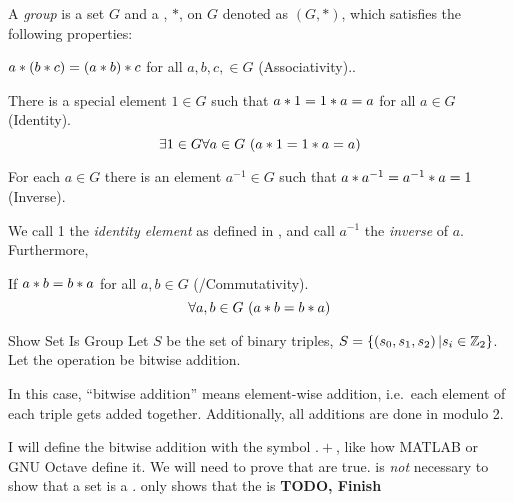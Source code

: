 \begin{definition}[Group]\label{def:Group}
  A \emph{group} is a set $G$ and a , $*$, on $G$ denoted as $(G, *)$, which satisfies the following properties:
  \begin{propertylist}
  \item $a * (b * c) = (a * b) * c$ for all $a, b, c, \in G$ (Associativity).\label{prop:Group_Properties-Associativity}.
  \item There is a special element $1 \in G$ such that $a * 1 = 1 * a = a$ for all $a \in G$ (Identity).\label{prop:Group_Properties-Identity}
    \begin{equation*}
      \exists 1 \in G \forall a \in G \, \left( a * 1 = 1 * a = a \right)
    \end{equation*}

  \item For each $a \in G$ there is an element $a^{-1} \in G$ such that $a * a^{-1} = a^{-1} * a = 1$  (Inverse).\label{prop:Group_Properties-Inverse}
  \end{propertylist}
  
  We call 1 the \emph{identity element} as defined in , and call $a^{-1}$ the \emph{inverse} of $a$.
  Furthermore,
  \begin{propertylist}[resume]
  \item If $a * b = b * a$ for all $a,b \in G$ (/Commutativity).\label{prop:Group_Properties-Commutativity}
    \begin{equation*}
      \forall a,b \in G \, \left( a * b = b * a \right)
    \end{equation*}
  \end{propertylist}
\end{definition}

\begin{example}{Show Set Is Group}
  Let $S$ be the set of binary triples, $S = \lbrace \left( s_{0}, s_{1}, s_{2} \right) \vert s_{i} \in \operatorname{\mathbb{Z}}_{2} \rbrace$.
  Let the operation be bitwise addition.
  \tcblower{}
  \begin{remark*}
    In this case, ``bitwise addition'' means element-wise addition, i.e.\ each element of each triple gets added together.
    Additionally, all additions are done in modulo 2.
  \end{remark*}
  I will define the bitwise addition  with the symbol $.+$, like how MATLAB or GNU Octave define it.
  We will need to prove that  are true.
   is \emph{not} necessary to show that a set is a .
   only shows that the  is 
  \textbf{TODO, Finish}
\end{example}

